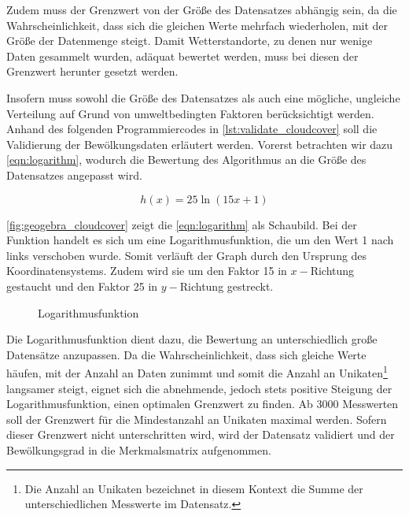 \documentclass[12pt, a4paper]{article}
\begin{document}
Zudem muss der Grenzwert von der Größe des Datensatzes abhängig sein, da die Wahrscheinlichkeit, dass sich die gleichen Werte mehrfach wiederholen, mit der Größe der Datenmenge steigt.  Damit Wetterstandorte, zu denen nur wenige Daten gesammelt wurden, adäquat bewertet werden, muss bei diesen der Grenzwert herunter gesetzt werden. 
 

Insofern muss sowohl die Größe des Datensatzes als auch eine mögliche, ungleiche Verteilung auf Grund von umweltbedingten Faktoren berücksichtigt werden. Anhand des folgenden Programmiercodes in \autoref{lst:validate_cloudcover} soll die Validierung der Bewölkungsdaten erläutert werden. Vorerst betrachten wir dazu \autoref{eqn:logarithm}, wodurch die Bewertung des Algorithmus an die Größe des Datensatzes angepasst wird.

\begin{equation}
\label{eqn:logarithm}
h(x)=25\ln(15x+1)
\end{equation}

\autoref{fig:geogebra_cloudcover} zeigt die \autoref{eqn:logarithm} als Schaubild. Bei der Funktion handelt es sich um eine Logarithmusfunktion, die um den Wert 1 nach links verschoben wurde. Somit verläuft der Graph durch den Ursprung des Koordinatensystems. Zudem wird sie um den Faktor 15 in $x-$Richtung gestaucht und den Faktor 25 in $y-$Richtung gestreckt.

\begin{figure}[h]
\centering
\def\svgwidth{425pt}

\caption{Logarithmusfunktion}
\label{fig:geogebra_cloudcover}
\end {figure}

Die Logarithmusfunktion dient dazu, die Bewertung an unterschiedlich große Datensätze anzupassen. Da die Wahrscheinlichkeit, dass sich gleiche Werte häufen, mit der Anzahl an Daten zunimmt und somit die Anzahl an Unikaten\footnote{Die Anzahl an Unikaten bezeichnet in diesem Kontext die Summe der unterschiedlichen Messwerte im Datensatz.} langsamer steigt, eignet sich die abnehmende, jedoch stets positive Steigung der Logarithmusfunktion, einen optimalen Grenzwert zu finden. Ab 3000 Messwerten soll der Grenzwert für die Mindestanzahl an Unikaten maximal werden. Sofern dieser Grenzwert nicht unterschritten wird, wird der Datensatz validiert und der Bewölkungsgrad in die Merkmalsmatrix aufgenommen. 
\end{document}
